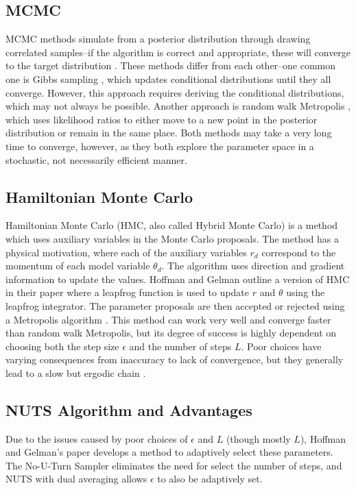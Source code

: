 \documentclass[12pt]{article}
\begin{document}
\subsection{MCMC}
MCMC methods simulate from a posterior distribution through drawing correlated samples--if the algorithm is correct and appropriate, these will converge to the target distribution \cite{neal}. These methods differ from each other--one common one is Gibbs sampling \cite{geman}, which updates conditional distributions until they all converge. However, this approach requires deriving the conditional distributions, which may not always be possible. Another approach is random walk Metropolis \cite{metropolis}, which uses likelihood ratios to either move to a new point in the posterior distribution or remain in the same place. Both methods may take a very long time to converge, however, as they both explore the parameter space in a stochastic, not necessarily efficient manner. 
\subsection{Hamiltonian Monte Carlo}
Hamiltonian Monte Carlo (HMC, also called Hybrid Monte Carlo) \cite{duane, neal} is a method which uses auxiliary variables in the Monte Carlo proposals. The method has a physical motivation, where each of the auxiliary variables $r_d$ correspond to the momentum of each model variable $\theta_d$. The algorithm uses direction and gradient information to update the values. Hoffman and Gelman outline a version of HMC in their paper where a leapfrog function is used to update $r$ and $\theta$ using the leapfrog integrator. The parameter proposals are then accepted or rejected using a Metropolis algorithm \cite{metropolis}. This method can work very well and converge faster than random walk Metropolis, but its degree of success is highly dependent on choosing both the step size $\epsilon$ and the number of steps $L$. Poor choices have varying consequences from inaccuracy to lack of convergence, but they generally lead to a slow but ergodic chain \cite{homan2014no}.

\subsection{NUTS Algorithm and Advantages}
Due to the issues caused by poor choices of $\epsilon$ and $L$ (though mostly $L$), Hoffman and Gelman's paper develops a method to adaptively select these parameters. The No-U-Turn Sampler eliminates the need for select the number of steps, and NUTS with dual averaging allows $\epsilon$ to also be adaptively set. 
\end{document}
